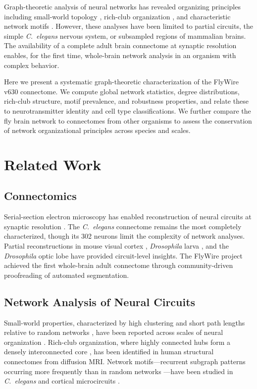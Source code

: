\documentclass[11pt]{article}
\begin{document}
Graph-theoretic analysis of neural networks has revealed organizing principles including small-world topology \citep{watts1998collective}, rich-club organization \citep{vandenHeuvel2011rich}, and characteristic network motifs \citep{milo2002network, song2005highly}. However, these analyses have been limited to partial circuits, the simple \textit{C.\ elegans} nervous system, or subsampled regions of mammalian brains. The availability of a complete adult brain connectome at synaptic resolution enables, for the first time, whole-brain network analysis in an organism with complex behavior.

Here we present a systematic graph-theoretic characterization of the FlyWire v630 connectome. We compute global network statistics, degree distributions, rich-club structure, motif prevalence, and robustness properties, and relate these to neurotransmitter identity and cell type classifications. We further compare the fly brain network to connectomes from other organisms to assess the conservation of network organizational principles across species and scales.

\section{Related Work}

\subsection{Connectomics}
Serial-section electron microscopy has enabled reconstruction of neural circuits at synaptic resolution \citep{helmstaedter2013connectomic}. The \textit{C.\ elegans} connectome \citep{white1986structure, varshney2011structural} remains the most completely characterized, though its 302 neurons limit the complexity of network analyses. Partial reconstructions in mouse visual cortex \citep{bock2011network}, \textit{Drosophila} larva \citep{winding2023connectome}, and the \textit{Drosophila} optic lobe \citep{takemura2013visual} have provided circuit-level insights. The FlyWire project \citep{dorkenwald2024flywire} achieved the first whole-brain adult connectome through community-driven proofreading of automated segmentation.

\subsection{Network Analysis of Neural Circuits}
Small-world properties, characterized by high clustering and short path lengths relative to random networks \citep{watts1998collective}, have been reported across scales of neural organization \citep{bassett2006small}. Rich-club organization, where highly connected hubs form a densely interconnected core \citep{vandenHeuvel2011rich}, has been identified in human structural connectomes from diffusion MRI. Network motifs---recurrent subgraph patterns occurring more frequently than in random networks \citep{milo2002network}---have been studied in \textit{C.\ elegans} and cortical microcircuits \citep{song2005highly}.
\end{document}
